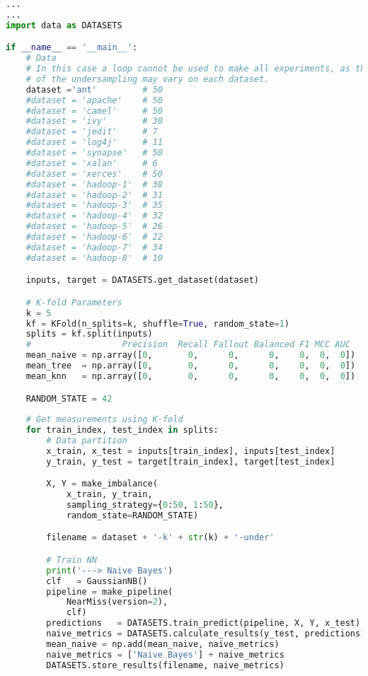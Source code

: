 \begin{lstlisting}[language=Python, caption={Calculate Metrics from Confusion 
Matrix to compare in-fold results after applying under-sampling filter}, 
label={lst:metrics-kfold-undersampling}]
...
...
import data as DATASETS

if __name__ == '__main__':
    # Data
    # In this case a loop cannot be used to make all experiments, as the value
    # of the undersampling may vary on each dataset.
    dataset ='ant'         # 50
    #dataset = 'apache'    # 50
    #dataset = 'camel'     # 50
    #dataset = 'ivy'       # 30
    #dataset = 'jedit'     # 7
    #dataset = 'log4j'     # 11
    #dataset = 'synapse'   # 50
    #dataset = 'xalan'     # 6
    #dataset = 'xerces'    # 50
    #dataset = 'hadoop-1'  # 38
    #dataset = 'hadoop-2'  # 31 
    #dataset = 'hadoop-3'  # 35
    #dataset = 'hadoop-4'  # 32
    #dataset = 'hadoop-5'  # 26
    #dataset = 'hadoop-6'  # 22
    #dataset = 'hadoop-7'  # 34
    #dataset = 'hadoop-8'  # 10

    inputs, target = DATASETS.get_dataset(dataset)

    # K-fold Parameters
    k = 5
    kf = KFold(n_splits=k, shuffle=True, random_state=1)
    splits = kf.split(inputs)
    #                  Precision  Recall Fallout Balanced F1 MCC AUC
    mean_naive = np.array([0,       0,      0,      0,    0,  0,  0])
    mean_tree  = np.array([0,       0,      0,      0,    0,  0,  0])
    mean_knn   = np.array([0,       0,      0,      0,    0,  0,  0])

    RANDOM_STATE = 42
    
    # Get measurements using K-fold
    for train_index, test_index in splits:
        # Data partition
        x_train, x_test = inputs[train_index], inputs[test_index]
        y_train, y_test = target[train_index], target[test_index]

        X, Y = make_imbalance(
            x_train, y_train,
            sampling_strategy={0:50, 1:50},
            random_state=RANDOM_STATE)

        filename = dataset + '-k' + str(k) + '-under'

        # Train NN
        print('---> Naive Bayes')
        clf   = GaussianNB() 
        pipeline = make_pipeline(
            NearMiss(version=2),
            clf)
        predictions   = DATASETS.train_predict(pipeline, X, Y, x_test)
        naive_metrics = DATASETS.calculate_results(y_test, predictions)
        mean_naive = np.add(mean_naive, naive_metrics)
        naive_metrics = ['Naive Bayes'] + naive_metrics
        DATASETS.store_results(filename, naive_metrics)


\end{lstlisting}
